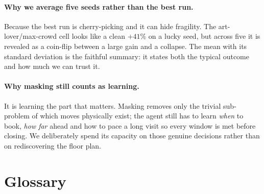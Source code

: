 \documentclass[11pt]{article}
\begin{document}
\paragraph{Why we average five seeds rather than the best run.} Because the best run is
cherry-picking and it can hide fragility. The art-lover/max-crowd cell looks like a clean
$+41\%$ on a lucky seed, but across five it is revealed as a coin-flip between a large gain
and a collapse. The mean with its standard deviation is the faithful summary: it states both
the typical outcome and how much we can trust it.

\paragraph{Why masking still counts as learning.} It is learning
the part that matters. Masking removes only the trivial sub-problem of which moves physically
exist; the agent still has to learn \emph{when} to book, \emph{how far} ahead and how to
pace a long visit so every window is met before closing. We deliberately spend its capacity
on those genuine decisions rather than on rediscovering the floor plan.

\section{Glossary}
\end{document}
